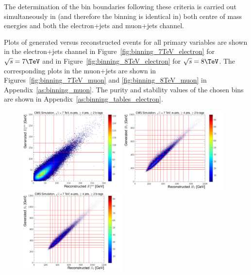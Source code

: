 The determination of the bin boundaries following these criteria is carried out simultaneously in (and
therefore the binning is identical in) both centre of mass energies and both the electron+jets and
muon+jets channel.

Plots of generated versus reconstructed events for all primary variables are shown in the electron+jets
channel in Figure~\ref{fig:binning_7TeV_electron} for $\sqrt{s}=7\TeV$ and in
Figure~\ref{fig:binning_8TeV_electron} for $\sqrt{s}=8\TeV$. The corresponding plots in the muon+jets are
shown in Figures~\ref{fig:binning_7TeV_muon} and \ref{fig:binning_8TeV_muon} in
Appendix~\ref{as:binning_muon}. The purity and stability values of the chosen bins are shown in
Appendix~\ref{as:binning_tables_electron}.

\begin{figure}[hbtp]
	\centering
     \includegraphics[width=0.48\textwidth]{Chapters/04_Analysis/04b_XSections/images/binning/electron_MET_7TeV.pdf}\hfill
     \includegraphics[width=0.48\textwidth]{Chapters/04_Analysis/04b_XSections/images/binning/electron_HT_7TeV.pdf}\\
     \includegraphics[width=0.48\textwidth]{Chapters/04_Analysis/04b_XSections/images/binning/electron_ST_7TeV.pdf}\hfill

\end{figure}
